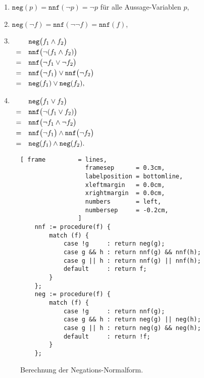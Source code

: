 \begin{enumerate}
\item $\texttt{neg}(p) = \texttt{nnf}(\neg p) = \neg p$ f\"{u}r alle Aussage-Variablen $p$,
\item $\texttt{neg}(\neg f) = \texttt{nnf}(\neg \neg f) = \texttt{nnf}(f)$,
\item $\begin{array}[t]{cl}
         & \texttt{neg}\bigl(f_1 \wedge f_2 \bigr) \\[0.1cm]
       = & \texttt{nnf}\bigl(\neg(f_1 \wedge f_2)\bigr) \\[0.1cm]
       = & \texttt{nnf}\bigl(\neg f_1 \vee \neg f_2\bigr) \\[0.1cm]
       = & \texttt{nnf}\bigl(\neg f_1\bigr) \vee \texttt{nnf}\bigl(\neg f_2\bigr) \\[0.1cm]
       = & \texttt{neg}(f_1) \vee \texttt{neg}(f_2),
       \end{array}
      $
\item $\begin{array}[t]{cl}
         & \texttt{neg}\bigl(f_1 \vee f_2 \bigr)        \\[0.1cm]
       = & \texttt{nnf}\bigl(\neg(f_1 \vee f_2) \bigr)  \\[0.1cm]
       = & \texttt{nnf}\bigl(\neg f_1 \wedge \neg f_2 \bigr)  \\[0.1cm]
       = & \texttt{nnf}\bigl(\neg f_1\bigr) \wedge \texttt{nnf}\bigl(\neg f_2 \bigr)  \\[0.1cm]
       = & \texttt{neg}(f_1) \wedge \texttt{neg}(f_2). 
       \end{array}
      $
\end{enumerate}

\begin{figure}[!ht]
  \centering
\begin{Verbatim}[ frame         = lines, 
                  framesep      = 0.3cm, 
                  labelposition = bottomline,
                  xleftmargin   = 0.0cm,
                  xrightmargin  = 0.0cm,
                  numbers       = left,
                  numbersep     = -0.2cm,
                ]
    nnf := procedure(f) {
        match (f) {
            case !g     : return neg(g);
            case g && h : return nnf(g) && nnf(h);
            case g || h : return nnf(g) || nnf(h);
            default     : return f; 
        }
    };
    neg := procedure(f) {
        match (f) {
            case !g     : return nnf(g);
            case g && h : return neg(g) || neg(h);
            case g || h : return neg(g) && neg(h);
            default     : return !f; 
        }
    };
\end{Verbatim}
\vspace*{-0.3cm}
  \caption{Berechnung der Negations-Normalform.}
  \label{fig:nnf}
\end{figure}



